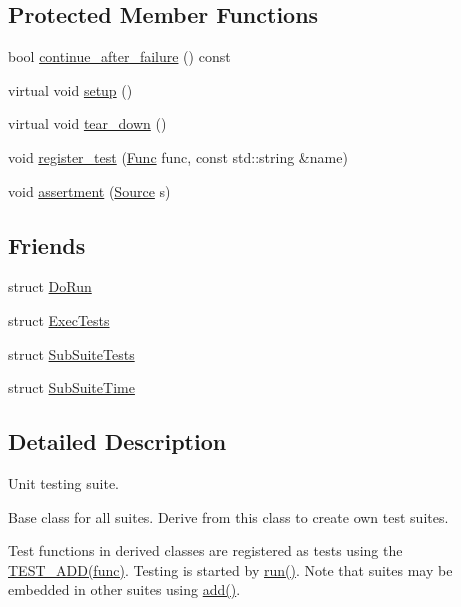 \subsection*{Protected Member Functions}
\begin{DoxyCompactItemize}
\item 
bool \mbox{\hyperlink{class_test_1_1_suite_a3e2289069402291cdb100483a3247c16}{continue\+\_\+after\+\_\+failure}} () const
\item 
virtual void \mbox{\hyperlink{class_test_1_1_suite_aa022f93f2bc7c0ca4f8bf0bb94758226}{setup}} ()
\item 
virtual void \mbox{\hyperlink{class_test_1_1_suite_a2f2f180307180f8fdb0ca718a12047d0}{tear\+\_\+down}} ()
\item 
void \mbox{\hyperlink{class_test_1_1_suite_a11e542d1d45905b817b00c35660700b9}{register\+\_\+test}} (\mbox{\hyperlink{class_test_1_1_suite_a87c40a9c763fc3221bee0e70c431038f}{Func}} func, const std\+::string \&name)
\item 
void \mbox{\hyperlink{class_test_1_1_suite_a1851ad75aed6141a19a06eeeb0fe0d3c}{assertment}} (\mbox{\hyperlink{class_test_1_1_source}{Source}} s)
\end{DoxyCompactItemize}
\subsection*{Friends}
\begin{DoxyCompactItemize}
\item 
struct \mbox{\hyperlink{class_test_1_1_suite_a843435d7ee79d23ed13e6eec5c7ac6bb}{Do\+Run}}
\item 
struct \mbox{\hyperlink{class_test_1_1_suite_ab4730d33c1241aba407b71f8eafb7bcc}{Exec\+Tests}}
\item 
struct \mbox{\hyperlink{class_test_1_1_suite_a901d2d72cc93e087c94d99680f65fa8e}{Sub\+Suite\+Tests}}
\item 
struct \mbox{\hyperlink{class_test_1_1_suite_a5933776e455e5bd9ad1d4a8b1c591aa2}{Sub\+Suite\+Time}}
\end{DoxyCompactItemize}


\subsection{Detailed Description}
Unit testing suite. 

Base class for all suites. Derive from this class to create own test suites.

Test functions in derived classes are registered as tests using the \mbox{\hyperlink{cpptest-suite_8h_abe8c3e0a2cf3893ebc1c265264ed9cb8}{T\+E\+S\+T\+\_\+\+A\+D\+D(func)}}. Testing is started by \mbox{\hyperlink{class_test_1_1_suite_ad17746e218da79c537bc9d21e389f570}{run()}}. Note that suites may be embedded in other suites using \mbox{\hyperlink{class_test_1_1_suite_a0237b63fc694ecb133d023cf2d6ab271}{add()}}. 


